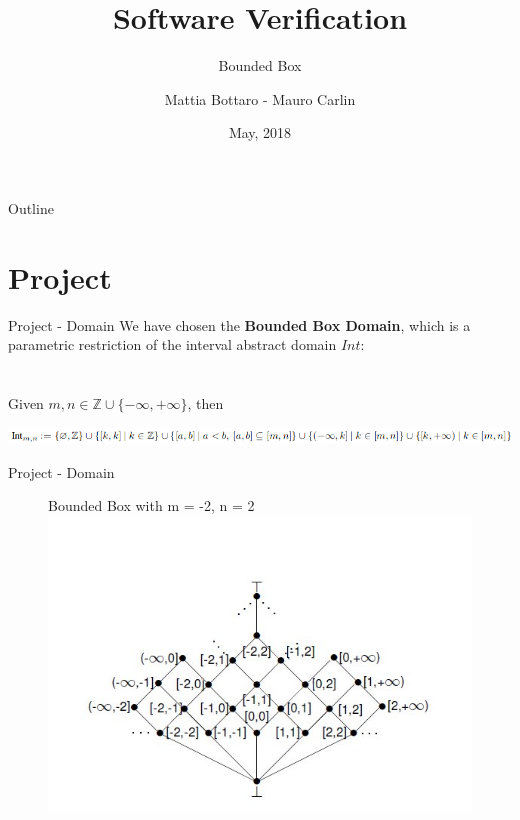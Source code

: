 \documentclass{beamer}
\title{Software Verification}
\subtitle{Bounded Box}
\author{Mattia Bottaro - Mauro Carlin}
\date{May, 2018}
\begin{document}
	\maketitle

	\begin{frame}{Outline}
		\tableofcontents
	\end{frame}


	\section{Project}

	\begin{frame}{Project - Domain}
	We have chosen the \textbf{Bounded Box Domain}, which is a parametric restriction of the interval abstract domain $Int$:\\~\\~\\

		 \scriptsize Given $m, n \in \mathbb{Z} \cup \{-\infty,+\infty\}$, then
	 \normalsize

	  \includegraphics[scale=0.40]{images/consegna.png}
	  	

	\end{frame}
	\begin{frame}{Project - Domain}
		\begin{figure}
			Bounded Box with m = -2, n = 2
			\includegraphics[scale=0.6]{images/box.png}
		\end{figure}

	\end{frame}
\end{document}
